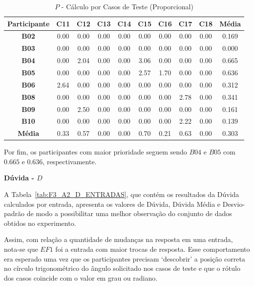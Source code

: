 \begin{table}[htbp]
	\centering
	\caption{$P$ - Cálculo por Casos de Teste (Proporcional)}
	\begin{tabular}{|c|c|c|c|c|c|c|c|c|c|}
		\hline
		\rowcolor[HTML]{D9D9D9} 
		\cellcolor[HTML]{D0CECE}\textbf{Participante} & \textbf{C11} & \textbf{C12} & \textbf{C13} & \textbf{C14} & \textbf{C15} & \textbf{C16} & \textbf{C17} & \textbf{C18} & \textbf{Média} \\ \hline
		\textbf{B02} & 0.00 & 0.00 & 0.00 & 0.00 & 0.00 & 0.00 & 0.00 & 0.00 & 0.169 \\ \hline
		\rowcolor[HTML]{F2F2F2} 
		\textbf{B03} & 0.00 & 0.00 & 0.00 & 0.00 & 0.00 & 0.00 & 0.00 & 0.00 & 0.000 \\ \hline
		\textbf{B04} & 0.00 & 2.04 & 0.00 & 0.00 & 3.06 & 0.00 & 0.00 & 0.00 & 0.665 \\ \hline
		\rowcolor[HTML]{F2F2F2} 
		\textbf{B05} & 0.00 & 0.00 & 0.00 & 0.00 & 2.57 & 1.70 & 0.00 & 0.00 & 0.636 \\ \hline
		\textbf{B06} & 2.64 & 0.00 & 0.00 & 0.00 & 0.00 & 0.00 & 0.00 & 0.00 & 0.312 \\ \hline
		\rowcolor[HTML]{F2F2F2} 
		\textbf{B08} & 0.00 & 0.00 & 0.00 & 0.00 & 0.00 & 0.00 & 2.78 & 0.00 & 0.341 \\ \hline
		\textbf{B09} & 0.00 & 2.50 & 0.00 & 0.00 & 0.00 & 0.00 & 0.00 & 0.00 & 0.161 \\ \hline
		\rowcolor[HTML]{F2F2F2} 
		\textbf{B10} & 0.00 & 0.00 & 0.00 & 0.00 & 0.00 & 0.00 & 2.22 & 0.00 & 0.139 \\ \hline
		\rowcolor[HTML]{D0CECE} 
		\textbf{Média} & 0.33 & 0.57 & 0.00 & 0.00 & 0.70 & 0.21 & 0.63 & 0.00 & 0.303 \\ \hline
	\end{tabular}
	\label{tab:F3_A2_P_CASOS_PROPORCIONAL_}
\end{table}

Por fim, os participantes com maior prioridade seguem sendo $B04$ e $B05$ com $0.665$ e $0.636$, respectivamente.
 
\textbf{Dúvida - $D$}

A Tabela~\ref{tab:F3_A2_D_ENTRADAS}, que contém os resultados da Dúvida calculados por entrada, apresenta os valores de Dúvida, Dúvida Média e Desvio-padrão de modo a possibilitar uma melhor observação do conjunto de dados obtidos no experimento.

Assim, com relação a quantidade de mudanças na resposta em uma entrada, nota-se que $EF1$ foi a entrada com maior trocas de resposta. Esse comportamento era esperado uma vez que os participantes precisam `descobrir' a posição correta no círculo trigonométrico do ângulo solicitado nos casos de teste e que o rótulo dos casos coincide com o valor em grau ou radiano. 

